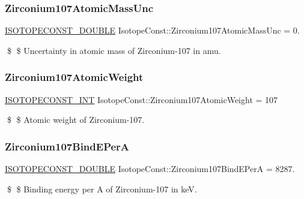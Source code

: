 \subsubsection{\texorpdfstring{Zirconium107\+Atomic\+Mass\+Unc}{Zirconium107AtomicMassUnc}}
{\footnotesize\ttfamily \mbox{\hyperlink{group___isotope_const-_macros_ga8f45a7272ce02c0b4c65c44636ed719a}{I\+S\+O\+T\+O\+P\+E\+C\+O\+N\+S\+T\+\_\+\+D\+O\+U\+B\+LE}} Isotope\+Const\+::\+Zirconium107\+Atomic\+Mass\+Unc = 0.}

\$ \$ Uncertainty in atomic mass of Zirconium-\/107 in amu. \mbox{\label{group___isotope_const-_zirconium-_zr107_gae5788e430400954084590ad706ce78c2}} 
\subsubsection{\texorpdfstring{Zirconium107\+Atomic\+Weight}{Zirconium107AtomicWeight}}
{\footnotesize\ttfamily \mbox{\hyperlink{group___isotope_const-_macros_ga5f18360b3e99483a35c32d789e62621c}{I\+S\+O\+T\+O\+P\+E\+C\+O\+N\+S\+T\+\_\+\+I\+NT}} Isotope\+Const\+::\+Zirconium107\+Atomic\+Weight = 107}

\$ \$ Atomic weight of Zirconium-\/107. \mbox{\label{group___isotope_const-_zirconium-_zr107_ga71a3a1f27a1b3b40a9d2346d5dbd3e6d}} 
\subsubsection{\texorpdfstring{Zirconium107\+Bind\+E\+PerA}{Zirconium107BindEPerA}}
{\footnotesize\ttfamily \mbox{\hyperlink{group___isotope_const-_macros_ga8f45a7272ce02c0b4c65c44636ed719a}{I\+S\+O\+T\+O\+P\+E\+C\+O\+N\+S\+T\+\_\+\+D\+O\+U\+B\+LE}} Isotope\+Const\+::\+Zirconium107\+Bind\+E\+PerA = 8287.}

\$ \$ Binding energy per A of Zirconium-\/107 in keV. \mbox{\label{group___isotope_const-_zirconium-_zr107_ga01aa470584e800893816d2c3a6321507}} 
